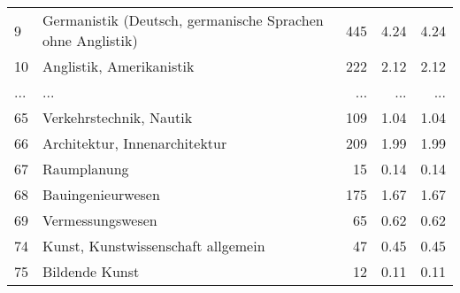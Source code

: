 \begin{longtable}{lXrrr}
        9 & \multicolumn{1}{X}{Germanistik (Deutsch, germanische Sprachen ohne Anglistik)} & %
          \num{445} &
          \num[round-mode=places,round-precision=2]{4,24} &
          \num[round-mode=places,round-precision=2]{4,24} \\
        10 & \multicolumn{1}{X}{Anglistik, Amerikanistik} & %
          \num{222} &
          \num[round-mode=places,round-precision=2]{2,12} &
          \num[round-mode=places,round-precision=2]{2,12} \\
       ... & ... & ... & ... & ... \\
        65 & \multicolumn{1}{X}{Verkehrstechnik, Nautik} & %
          \num{109} &
          \num[round-mode=places,round-precision=2]{1,04} &
          \num[round-mode=places,round-precision=2]{1,04} \\

        66 & \multicolumn{1}{X}{Architektur, Innenarchitektur} & %
          \num{209} &
          \num[round-mode=places,round-precision=2]{1,99} &
          \num[round-mode=places,round-precision=2]{1,99} \\

        67 & \multicolumn{1}{X}{Raumplanung} & %
          \num{15} &
          \num[round-mode=places,round-precision=2]{0,14} &
          \num[round-mode=places,round-precision=2]{0,14} \\

        68 & \multicolumn{1}{X}{Bauingenieurwesen} & %
          \num{175} &
          \num[round-mode=places,round-precision=2]{1,67} &
          \num[round-mode=places,round-precision=2]{1,67} \\

        69 & \multicolumn{1}{X}{Vermessungswesen} & %
          \num{65} &
          \num[round-mode=places,round-precision=2]{0,62} &
          \num[round-mode=places,round-precision=2]{0,62} \\

        74 & \multicolumn{1}{X}{Kunst, Kunstwissenschaft allgemein} & %
          \num{47} &
          \num[round-mode=places,round-precision=2]{0,45} &
          \num[round-mode=places,round-precision=2]{0,45} \\

        75 & \multicolumn{1}{X}{Bildende Kunst} & %
          \num{12} &
          \num[round-mode=places,round-precision=2]{0,11} &
          \num[round-mode=places,round-precision=2]{0,11} \\


\end{longtable}
